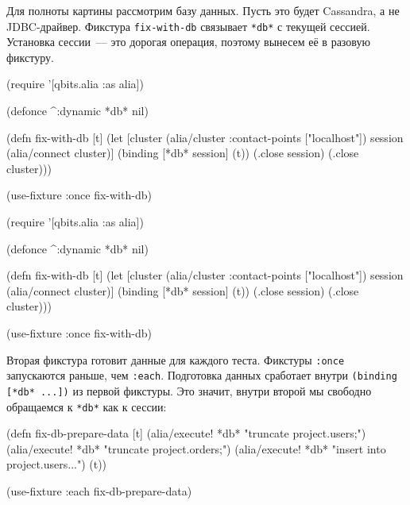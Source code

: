 
Для полноты картины рассмотрим базу данных. Пусть это будет Cassandra, а не
JDBC-драйвер. Фикстура \verb|fix-with-db| связывает \verb|*db*| с текущей
сессией. Установка сессии~--- это дорогая операция, поэтому вынесем её в разовую
фикстуру.

\ifx\devicetype\mobile

\begin{english}
  \begin{clojure}
(require '[qbits.alia :as alia])

(defonce ^:dynamic *db* nil)

(defn fix-with-db [t]
  (let [cluster (alia/cluster
                  {:contact-points
                   ["localhost"]})
        session (alia/connect cluster)]
    (binding [*db* session]
      (t))
    (.close session)
    (.close cluster)))

(use-fixture :once fix-with-db)
  \end{clojure}
\end{english}

\else

\begin{english}
  \begin{clojure}
(require '[qbits.alia :as alia])

(defonce ^:dynamic *db* nil)

(defn fix-with-db [t]
  (let [cluster (alia/cluster {:contact-points ["localhost"]})
        session (alia/connect cluster)]
    (binding [*db* session]
      (t))
    (.close session)
    (.close cluster)))

(use-fixture :once fix-with-db)
  \end{clojure}
\end{english}

\fi

Вторая фикстура готовит данные для каждого теста. Фикстуры \verb|:once|
запускаются раньше, чем \verb|:each|. Подготовка данных сработает внутри
\verb|(binding [*db* ...])| из первой фикстуры. Это значит, внутри второй мы
свободно обращаемся к \verb|*db*| как к сессии:


\ifx\devicetype\mobile

\begin{english}
  \begin{clojure}
(defn fix-db-prepare-data [t]
  (alia/execute! *db*
    "truncate project.users;")
  (alia/execute! *db*
    "truncate project.orders;")
  (alia/execute! *db*
    "insert into project.users...")
  (t))

(use-fixture :each fix-db-prepare-data)
  \end{clojure}
\end{english}

